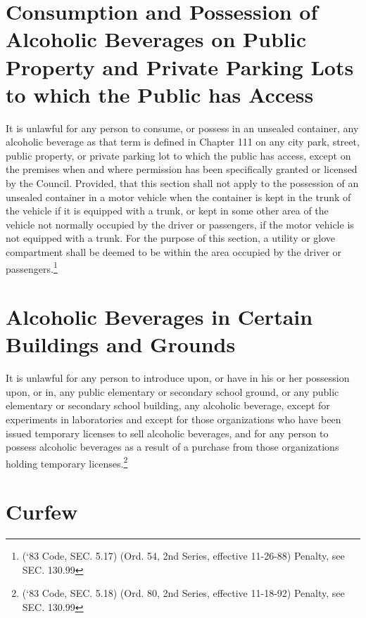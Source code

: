 \section{Consumption and Possession of Alcoholic Beverages on Public Property and Private Parking Lots to which the Public has Access}
It is unlawful for any person to consume, or possess in an unsealed container, any alcoholic beverage as that term is defined in Chapter 111 on any city park, street, public property, or private parking lot to which the public has access, except on the premises when and where permission has been specifically granted or licensed by the Council.  Provided, that this section shall not apply to the possession of an unsealed container in a motor vehicle when the container is kept in the trunk of the vehicle if it is equipped with a trunk, or kept in some other area of the vehicle not normally occupied by the driver or passengers, if the motor vehicle is not equipped with a trunk.  For the purpose of this section, a utility or glove compartment shall be deemed to be within the area occupied by the driver or passengers.\footnote{(‘83 Code, SEC. 5.17)  (Ord. 54, 2nd Series, effective 11-26-88)  Penalty, see SEC. 130.99}

\section{Alcoholic Beverages in Certain Buildings and Grounds}
It is unlawful for any person to introduce upon, or have in his or her possession upon, or in, any public elementary or secondary school ground, or any public elementary or secondary school building, any alcoholic beverage, except for experiments in laboratories and except for those organizations who have been issued temporary licenses to sell alcoholic beverages, and for any person to possess alcoholic beverages as a result of a purchase from those organizations holding temporary licenses.\footnote{(‘83 Code, SEC. 5.18)  (Ord. 80, 2nd Series, effective 11-18-92)  Penalty, see SEC. 130.99}

\section{Curfew}
